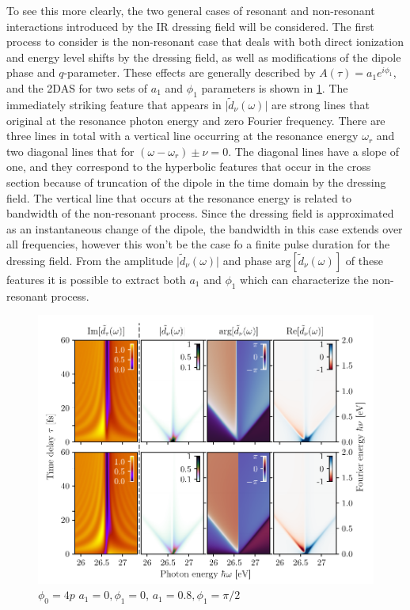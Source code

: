 To see this more clearly, the two general cases of resonant and non-resonant interactions introduced by the IR dressing field will be considered.  The first process to consider is the non-resonant case that deals with both direct ionization and energy level shifts by the dressing field, as well as modifications of the dipole phase and $q$-parameter.  These effects are generally described by $A(\tau)=a_1e^{i\phi_1}$, and the 2DAS for two sets of $a_1$ and $\phi_1$ parameters is shown in \ref{fig:non_res_high_low}. The immediately striking feature that appears in $\rvert\tilde{d}_\nu(\omega)\lvert$ are strong lines that original at the resonance photon energy and zero Fourier frequency.  There are three lines in total with a vertical line occurring at the resonance energy $\omega_r$  and two diagonal lines that for $(\omega-\omega_r)\pm\nu=0$. The diagonal lines have a slope of one, and they correspond to the hyperbolic features that occur in the cross section because of truncation of the dipole in the time domain by the dressing field.  The vertical line that occurs at the resonance energy is related to bandwidth of the non-resonant process.  Since the dressing field is approximated as an instantaneous change of the dipole, the bandwidth in this case extends over all frequencies, however this won't be the case fo a finite pulse duration for the dressing field.  From the amplitude $\rvert\tilde{d}_\nu(\omega)\lvert$ and phase $\mathrm{arg}[\tilde{d}_\nu(\omega)]$ of these features it is possible to extract both $a_1$ and $\phi_1$ which can characterize the non-resonant process. 
\begin{figure}
	\centering
	\includegraphics[width=1.0\textwidth]{figures/ATS/DCM_non_res_high_low.pdf}
	\caption{$\phi_0=4p$ $a_1=0,\phi_1=0$, $a_1=0.8,\phi_1=\pi/2$}
	\label{fig:non_res_high_low}
\end{figure}


